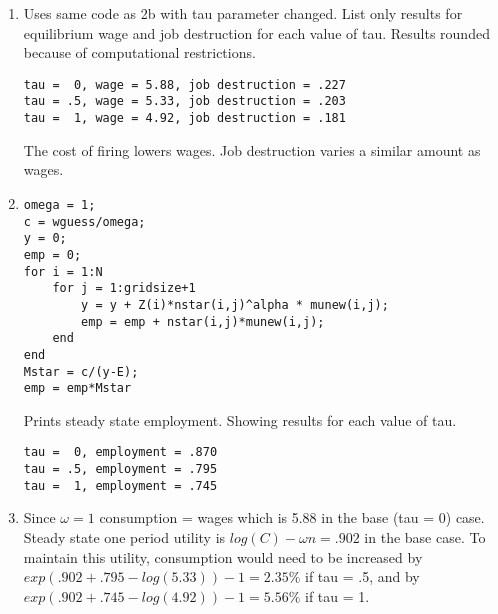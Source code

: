 \documentclass[12pt]{article}
\begin{document}
\begin{onehalfspace}
\begin{enumerate}[1.]
    
    \item Uses same code as 2b with tau parameter changed. List only results for equilibrium wage and job destruction for each value of tau. Results rounded because of computational restrictions.
\begin{lstlisting}
tau =  0, wage = 5.88, job destruction = .227
tau = .5, wage = 5.33, job destruction = .203
tau =  1, wage = 4.92, job destruction = .181
\end{lstlisting}
The cost of firing lowers wages. Job destruction varies a similar amount as wages.
    \item
\begin{lstlisting}
omega = 1;
c = wguess/omega;
y = 0;
emp = 0;
for i = 1:N
    for j = 1:gridsize+1
        y = y + Z(i)*nstar(i,j)^alpha * munew(i,j);
        emp = emp + nstar(i,j)*munew(i,j);
    end
end
Mstar = c/(y-E);
emp = emp*Mstar
\end{lstlisting}
Prints steady state employment. Showing results for each value of tau.
\begin{lstlisting}
tau =  0, employment = .870
tau = .5, employment = .795
tau =  1, employment = .745
\end{lstlisting}
    \item
    Since $\omega=1$ consumption = wages which is 5.88 in the base (tau = 0) case. Steady state one period utility is $log(C) - \omega n = .902$ in the base case. To maintain this utility, consumption would need to be increased by $exp\left(.902+.795 - log(5.33)\right)-1 = 2.35\%$ if tau = .5, and by $exp\left(.902+.745 - log(4.92)\right)-1 = 5.56\%$ if tau = 1.
\end{enumerate}

\end{onehalfspace}
\end{document}
